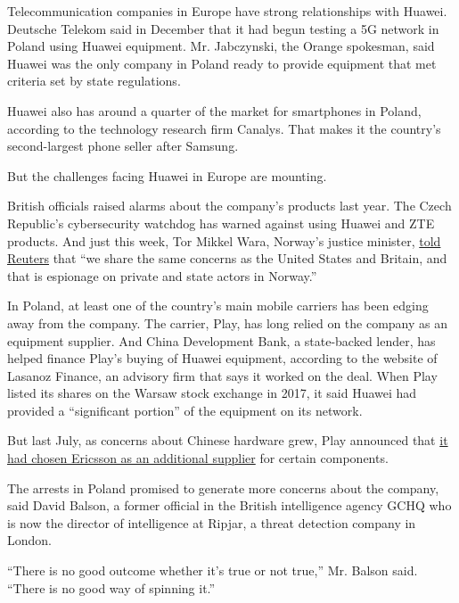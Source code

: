 Telecommunication companies in Europe have strong relationships with
Huawei. Deutsche Telekom said in December that it had begun testing a 5G
network in Poland using Huawei equipment. Mr. Jabczynski, the Orange
spokesman, said Huawei was the only company in Poland ready to provide
equipment that met criteria set by state regulations.

Huawei also has around a quarter of the market for smartphones in
Poland, according to the technology research firm Canalys. That makes it
the country's second-largest phone seller after Samsung.

But the challenges facing Huawei in Europe are mounting.

British officials raised alarms about the company's products last year.
The Czech Republic's cybersecurity watchdog has warned against using
Huawei and ZTE products. And just this week, Tor Mikkel Wara, Norway's
justice minister,
\href{https://www.reuters.com/article/us-norway-huawei-tech/norway-considering-whether-to-exclude-huawei-from-building-5g-network-idUSKCN1P31LJ}{told
Reuters} that ``we share the same concerns as the United States and
Britain, and that is espionage on private and state actors in Norway.''

In Poland, at least one of the country's main mobile carriers has been
edging away from the company. The carrier, Play, has long relied on the
company as an equipment supplier. And China Development Bank, a
state-backed lender, has helped finance Play's buying of Huawei
equipment, according to the website of Lasanoz Finance, an advisory firm
that says it worked on the deal. When Play listed its shares on the
Warsaw stock exchange in 2017, it said Huawei had provided a
``significant portion'' of the equipment on its network.

But last July, as concerns about Chinese hardware grew, Play announced
that
\href{https://www.ericsson.com/en/press-releases/2018/7/play-selects-ericsson-to-accelerate-nationwide-mobile-network-expansion-in-poland}{it
had chosen Ericsson as an additional supplier} for certain components.

The arrests in Poland promised to generate more concerns about the
company, said David Balson, a former official in the British
intelligence agency GCHQ who is now the director of intelligence at
Ripjar, a threat detection company in London.

``There is no good outcome whether it's true or not true,'' Mr. Balson
said. ``There is no good way of spinning it.''

